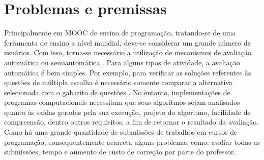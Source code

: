 \chapter{Problemas e premissas}
\label{chapter:problemas-premissas}

Principalmente em \acs{MOOC} de ensino de programação, tratando-se de uma ferramenta de
ensino a nível mundial, deve-se considerar um grande número de usuários. Com isso,
torna-se necessário a utilização de mecanismos de avaliação automática ou
semiautomática \cite{schmidt2013producing}. Para alguns tipos de atividade, a
avaliação automática é bem simples. Por exemplo, para verificar as soluções
referentes às questões de múltipla escolha é necessário somente comparar a
alternativa selecionada com o gabarito de questões \cite{alario2013analysing}. No
entanto, implementações de programas computacionais necessitam que seus algoritmos
sejam analisados quanto às saídas geradas pela sua execução, projeto do algoritmo,
facilidade de compreensão, dentro outros requisitos, a fim de retornar o resultado
da avaliação. Como há uma grande quantidade de submissões de trabalhos em cursos
de programação, consequentemente acarreta alguns problemas como: avaliar todas as
submissões, tempo e aumento de custo de correção por parte do professor.

